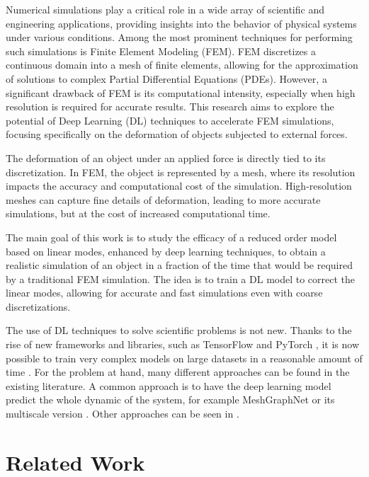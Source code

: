 
Numerical simulations play a critical role in a wide array of scientific and engineering applications, providing insights into the behavior of physical systems under various conditions. Among the most prominent techniques for performing such simulations is Finite Element Modeling (FEM). FEM discretizes a continuous domain into a mesh of finite elements, allowing for the approximation of solutions to complex Partial Differential Equations (PDEs). However, a significant drawback of FEM is its computational intensity, especially when high resolution is required for accurate results. This research aims to explore the potential of Deep Learning (DL) techniques to accelerate FEM simulations, focusing specifically on the deformation of objects subjected to external forces.

The deformation of an object under an applied force is directly tied to its discretization. In FEM, the object is represented by a mesh, where its resolution impacts the accuracy and computational cost of the simulation. High-resolution meshes can capture fine details of deformation, leading to more accurate simulations, but at the cost of increased computational time.

The main goal of this work is to study the efficacy of a reduced order model based on linear modes, enhanced by deep learning techniques, to obtain a realistic simulation of an object in a fraction of the time that would be required by a traditional FEM simulation. The idea is to train a DL model to correct the linear modes, allowing for accurate and fast simulations even with coarse discretizations.

The use of DL techniques to solve scientific problems is not new. Thanks to the rise of new frameworks and libraries, such as TensorFlow \cite{tensorflow2015-whitepaper} and PyTorch \cite{paszke2019pytorchimperativestylehighperformance}, it is now possible to train very complex models on large datasets in a reasonable amount of time \cite{tensorflow2015-whitepaper, pytorch}. For the problem at hand, many different approaches can be found in the existing literature. A common approach is to have the deep learning model predict the whole dynamic of the system, for example MeshGraphNet \cite{pfaffLearningMeshBasedSimulation2021a} or its multiscale version \cite{fortunatoMultiScaleMeshGraphNets2022}. Other approaches can be seen in \cite{jiangMeshfreeFlowNetPhysicsConstrainedDeep2020, hanPredictingPhysicsMeshreduced2022a}. 

\section*{Related Work}

